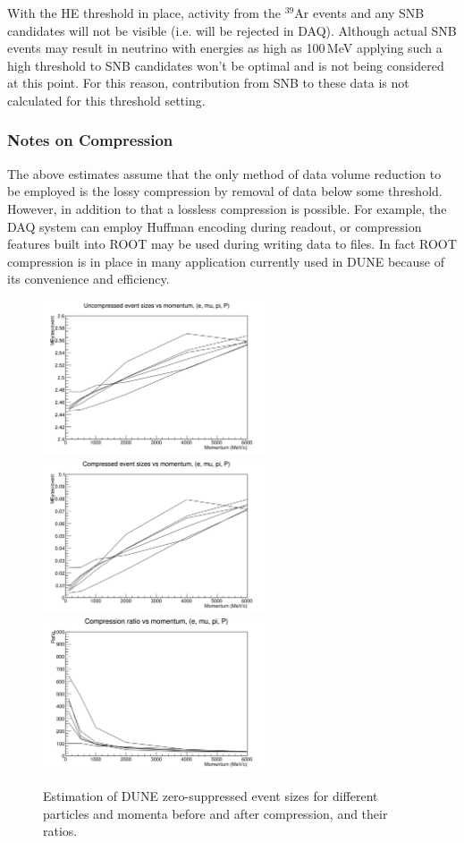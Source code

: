 \noindent
With the HE threshold in place, activity from the $^{39}$Ar events and any SNB
candidates will not be visible (i.e. will be rejected in DAQ). Although actual SNB
events may result in neutrino with energies as high as 100\,MeV applying such a high
threshold to SNB candidates won't be optimal and is not being considered at this point.
For this reason, contribution from SNB to these data is not calculated for this threshold setting.


\subsubsection{Notes on Compression}
\label{sec:data-compression}

The above estimates assume that the only method of data volume reduction to be employed is the
lossy compression by removal of data below some threshold.
However, in addition to that
a lossless compression is possible. For example, the DAQ system can employ Huffman encoding
during readout, or compression features built into ROOT may be used during writing data to files.
In fact ROOT compression is in place in many application currently used in DUNE because of its
convenience and efficiency.
\begin{figure}
[h!]
	\centering
	\includegraphics[width=0.6\textwidth]{btot.png}
	\includegraphics[width=0.6\textwidth]{bzip.png}
	\includegraphics[width=0.6\textwidth]{brat.png}
	\caption{Estimation of DUNE zero-suppressed event sizes for different particles and momenta before and after compression, and their ratios.}
	\label{fig:data-compression}
\end{figure}
